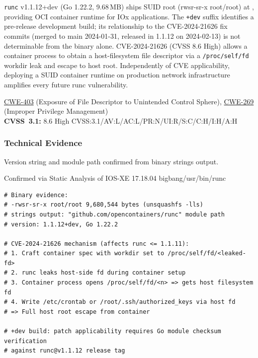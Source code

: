 \documentclass[11pt,a4paper]{article}
\begin{document}
\begin{overviewbox}
\texttt{runc} v1.1.12+dev (Go 1.22.2, 9.68\,MB) ships SUID root (rwsr-sr-x root/root) at
, providing OCI container runtime for IOx applications. The
\texttt{+dev} suffix identifies a pre-release development build; its relationship to the
CVE-2024-21626 fix commits (merged to main 2024-01-31, released in 1.1.12 on 2024-02-13)
is not determinable from the binary alone. CVE-2024-21626 (CVSS 8.6 High) allows a
container process to obtain a host-filesystem file descriptor via a \texttt{/proc/self/fd}
workdir leak and escape to host root. Independently of CVE applicability, deploying a SUID
container runtime on production network infrastructure amplifies every future runc
vulnerability.

\href{https://cwe.mitre.org/data/definitions/403.html}{CWE-403} (Exposure of File Descriptor to Unintended Control Sphere),
\href{https://cwe.mitre.org/data/definitions/269.html}{CWE-269} (Improper Privilege Management)\\
\textbf{CVSS~3.1:} 8.6 High \quad CVSS:3.1/AV:L/AC:L/PR:N/UI:R/S:C/C:H/I:H/A:H
\end{overviewbox}

\subsubsection{Technical Evidence}

Version string and module path confirmed from binary strings output.

\begin{pocbox}{Confirmed via Static Analysis of IOS-XE 17.18.04 bigbang/usr/bin/runc}
\begin{lstlisting}[style=bash]
# Binary evidence:
# -rwsr-sr-x root/root 9,680,544 bytes (unsquashfs -lls)
# strings output: "github.com/opencontainers/runc" module path
# version: 1.1.12+dev, Go 1.22.2

# CVE-2024-21626 mechanism (affects runc <= 1.1.11):
# 1. Craft container spec with workdir set to /proc/self/fd/<leaked-fd>
# 2. runc leaks host-side fd during container setup
# 3. Container process opens /proc/self/fd/<n> => gets host filesystem fd
# 4. Write /etc/crontab or /root/.ssh/authorized_keys via host fd
# => Full host root escape from container

# +dev build: patch applicability requires Go module checksum verification
# against runc@v1.1.12 release tag
\end{lstlisting}
\end{pocbox}
\end{document}
